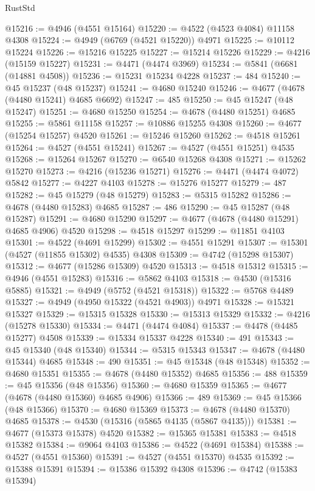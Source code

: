 \begin{lexlean}{RustStd}
\begin{coremodule}
@15216 := @4946 (@4551 @15164)
@15220 := @4522 (@4523 @4084) @11158 @4308
@15224 := @4949 (@6769 (@4521 @15220)) @4971
@15225 := @10112 @15224
@15226 := @15216 @15225
@15227 := @15214 @15226
@15229 := @4216 (@15159 @15227)
@15231 := @4471 (@4474 @3969)
@15234 := @5841 (@6681 (@14881 @4508))
@15236 := @15231 @15234 @4228
@15237 := 484
@15240 := @45 @15237 (@48 @15237)
@15241 := @4680 @15240
@15246 := @4677 (@4678 (@4480 @15241) @4685 @6692)
@15247 := 485
@15250 := @45 @15247 (@48 @15247)
@15251 := @4680 @15250
@15254 := @4678 (@4480 @15251) @4685
@15255 := @5861 @11158
@15257 := @10886 @15255 @4308
@15260 := @4677 (@15254 @15257) @4520
@15261 := @15246 @15260
@15262 := @4518 @15261
@15264 := @4527 (@4551 @15241)
@15267 := @4527 (@4551 @15251) @4535
@15268 := @15264 @15267
@15270 := @6540 @15268 @4308
@15271 := @15262 @15270
@15273 := @4216 (@15236 @15271)
@15276 := @4471 (@4474 @4072) @5842
@15277 := @4227 @4103
@15278 := @15276 @15277
@15279 := 487
@15282 := @45 @15279 (@48 @15279)
@15283 := @5315 @15282
@15286 := @4678 (@4480 @15283) @4685
@15287 := 486
@15290 := @45 @15287 (@48 @15287)
@15291 := @4680 @15290
@15297 := @4677 (@4678 (@4480 @15291) @4685 @4906) @4520
@15298 := @4518 @15297
@15299 := @11851 @4103
@15301 := @4522 (@4691 @15299)
@15302 := @4551 @15291
@15307 := @15301 (@4527 (@11855 @15302) @4535) @4308
@15309 := @4742 (@15298 @15307)
@15312 := @4677 (@15286 @15309) @4520
@15313 := @4518 @15312
@15315 := @4946 (@4551 @15283)
@15316 := @5862 @4103
@15318 := @4530 (@15316 @5885)
@15321 := @4949 (@5752 (@4521 @15318))
@15322 := @5768 @4489
@15327 := @4949 (@4950 @15322 (@4521 @4903)) @4971
@15328 := @15321 @15327
@15329 := @15315 @15328
@15330 := @15313 @15329
@15332 := @4216 (@15278 @15330)
@15334 := @4471 (@4474 @4084)
@15337 := @4478 (@4485 @15277) @4508
@15339 := @15334 @15337 @4228
@15340 := 491
@15343 := @45 @15340 (@48 @15340)
@15344 := @5315 @15343
@15347 := @4678 (@4480 @15344) @4685
@15348 := 490
@15351 := @45 @15348 (@48 @15348)
@15352 := @4680 @15351
@15355 := @4678 (@4480 @15352) @4685
@15356 := 488
@15359 := @45 @15356 (@48 @15356)
@15360 := @4680 @15359
@15365 := @4677 (@4678 (@4480 @15360) @4685 @4906)
@15366 := 489
@15369 := @45 @15366 (@48 @15366)
@15370 := @4680 @15369
@15373 := @4678 (@4480 @15370) @4685
@15378 := @4530 (@15316 (@5865 @4135 (@5867 @4135)))
@15381 := @4677 (@15373 @15378) @4520
@15382 := @15365 @15381
@15383 := @4518 @15382
@15384 := @9064 @4103
@15386 := @4522 (@4691 @15384)
@15388 := @4527 (@4551 @15360)
@15391 := @4527 (@4551 @15370) @4535
@15392 := @15388 @15391
@15394 := @15386 @15392 @4308
@15396 := @4742 (@15383 @15394)

\end{coremodule}
\end{lexlean}
